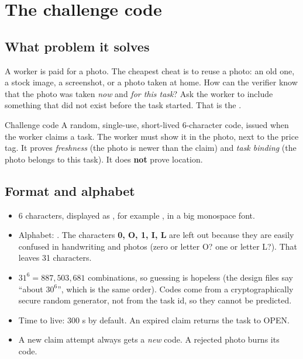 \section{The challenge code}
\subsection{What problem it solves}
A worker is paid for a photo. The cheapest cheat is to reuse a photo: an old one, a stock image, a screenshot, or a photo taken at home. How can the verifier know that the photo was taken \emph{now} and \emph{for this task}? Ask the worker to include something that did not exist before the task started. That is the .

\begin{conceptbox}{Challenge code}
A random, single-use, short-lived 6-character code, issued when the worker claims a task. The worker must show it in the photo, next to the price tag. It proves \emph{freshness} (the photo is newer than the claim) and \emph{task binding} (the photo belongs to this task). It does \textbf{not} prove location.
\end{conceptbox}

\subsection{Format and alphabet}
\begin{itemize}
  \item 6 characters, displayed as , for example , in a big monospace font.
  \item Alphabet: . The characters \textbf{0, O, 1, I, L} are left out because they are easily confused in handwriting and photos (zero or letter O? one or letter L?). That leaves 31 characters.
  \item $31^6 = 887{,}503{,}681$ combinations, so guessing is hopeless (the design files say ``about $30^6$'', which is the same order). Codes come from a cryptographically secure random generator, not from the task id, so they cannot be predicted.
  \item Time to live: 300 s by default. An expired claim returns the task to OPEN.
  \item A new claim attempt always gets a \emph{new} code. A rejected photo burns its code.
\end{itemize}

